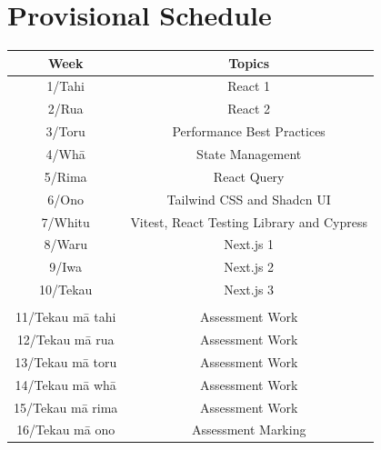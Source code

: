 \documentclass{article}
\begin{document}
\section*{Provisional Schedule}
\renewcommand{\arraystretch}{1.5}
\begin{tabular}{|c|c|c|}
	\hline
	\textbf{Week}                  & \multicolumn{2}{c|}{\textbf{Topics}}                                                                                             \\ \hline
	1/Tahi           & \multicolumn{2}{c|}{React 1}    \\ \hline
	2/Rua            & \multicolumn{2}{c|}{React 2}                   \\ \hline
	3/Toru           & \multicolumn{2}{c|}{Performance Best Practices} \\ \hline
	4/Whā            & \multicolumn{2}{c|}{State Management}                               \\ \hline
	5/Rima           & \multicolumn{2}{c|}{React Query}                                                \\ \hline
	6/Ono            & \multicolumn{2}{c|}{Tailwind CSS and Shadcn UI}                                                   \\ \hline
	7/Whitu          &  \multicolumn{2}{c|}{Vitest, React Testing Library and Cypress}                            \\ \hline
	8/Waru           & \multicolumn{2}{c|}{Next.js 1}                                                   \\ \hline
	9/Iwa            & \multicolumn{2}{c|}{Next.js 2}                                                                 \\ \hline
	10/Tekau         & \multicolumn{2}{c|}{Next.js 3}                                                                 \\ \hline
	\rowcolor{yellow} \multicolumn{3}{|c|}{Mid Semester Break}                                                                                                                         \\ \hline
	11/Tekau mā tahi & \multicolumn{2}{c|}{Assessment Work}                                                                 \\ \hline
	12/Tekau mā rua  & \multicolumn{2}{c|}{Assessment Work}                                                                 \\ \hline
	13/Tekau mā toru & \multicolumn{2}{c|}{Assessment Work}                                                     \\ \hline
	14/Tekau mā whā  & \multicolumn{2}{c|}{Assessment Work} \\ \hline 
	15/Tekau mā rima & \multicolumn{2}{c|}{Assessment Work}                                                       \\ \hline
	16/Tekau mā ono  & \multicolumn{2}{c|}{Assessment Marking}                                                         \\ \hline
\end{tabular} 
\end{document}
